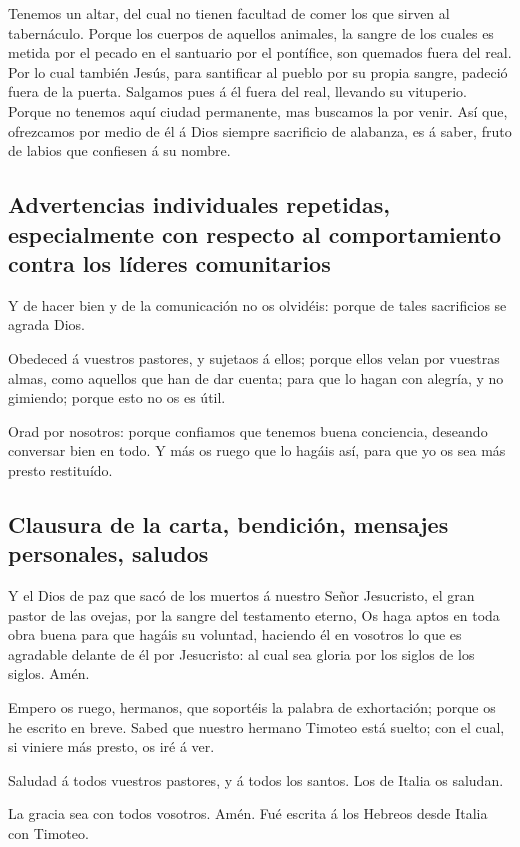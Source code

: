  Tenemos un altar, del cual no tienen facultad de comer
los que sirven al tabernáculo.  Porque los cuerpos de
aquellos animales, la sangre de los cuales es metida por el pecado en el
santuario por el pontífice, son quemados fuera del real. 
Por lo cual también Jesús, para santificar al pueblo por su propia
sangre, padeció fuera de la puerta.  Salgamos pues á él
fuera del real, llevando su vituperio.  Porque no tenemos
aquí ciudad permanente, mas buscamos la por venir.  Así
que, ofrezcamos por medio de él á Dios siempre sacrificio de alabanza,
es á saber, fruto de labios que confiesen á su nombre.

\hypertarget{advertencias-individuales-repetidas-especialmente-con-respecto-al-comportamiento-contra-los-luxedderes-comunitarios}{%
\subsection{Advertencias individuales repetidas, especialmente con
respecto al comportamiento contra los líderes
comunitarios}\label{advertencias-individuales-repetidas-especialmente-con-respecto-al-comportamiento-contra-los-luxedderes-comunitarios}}

 Y de hacer bien y de la comunicación no os olvidéis:
porque de tales sacrificios se agrada Dios.

 Obedeced á vuestros pastores, y sujetaos á ellos; porque
ellos velan por vuestras almas, como aquellos que han de dar cuenta;
para que lo hagan con alegría, y no gimiendo; porque esto no os es útil.

 Orad por nosotros: porque confiamos que tenemos buena
conciencia, deseando conversar bien en todo.  Y más os
ruego que lo hagáis así, para que yo os sea más presto restituído.

\hypertarget{clausura-de-la-carta-bendiciuxf3n-mensajes-personales-saludos}{%
\subsection{Clausura de la carta, bendición, mensajes personales,
saludos}\label{clausura-de-la-carta-bendiciuxf3n-mensajes-personales-saludos}}

 Y el Dios de paz que sacó de los muertos á nuestro Señor
Jesucristo, el gran pastor de las ovejas, por la sangre del testamento
eterno,  Os haga aptos en toda obra buena para que hagáis
su voluntad, haciendo él en vosotros lo que es agradable delante de él
por Jesucristo: al cual sea gloria por los siglos de los siglos. Amén.

 Empero os ruego, hermanos, que soportéis la palabra de
exhortación; porque os he escrito en breve.  Sabed que
nuestro hermano Timoteo está suelto; con el cual, si viniere más presto,
os iré á ver.

 Saludad á todos vuestros pastores, y á todos los santos.
Los de Italia os saludan.

 La gracia sea con todos vosotros. Amén. Fué escrita á
los Hebreos desde Italia con Timoteo.
